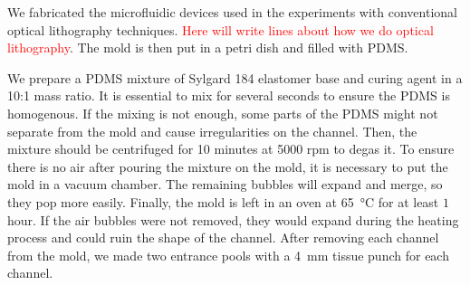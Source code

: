 We fabricated the microfluidic devices used in the experiments with conventional optical lithography techniques. \textcolor{red}{Here will write lines about how we do optical lithography}. The mold is then put in a petri dish and filled with PDMS. 


We prepare a PDMS mixture of Sylgard 184 elastomer base and curing agent in a 10:1 mass ratio. It is essential to mix for several seconds to ensure the PDMS is homogenous. If the mixing is not enough, some parts of the PDMS might not separate from the mold and cause irregularities on the channel. Then, the mixture should be centrifuged for 10 minutes at 5000 rpm to degas it. To ensure there is no air after pouring the mixture on the mold, it is necessary to put the mold in a vacuum chamber. The remaining bubbles will expand and merge, so they pop more easily. Finally, the mold is left in an oven at \SI{65}{\degreeCelsius} for at least $1$ hour. If the air bubbles were not removed, they would expand during the heating process and could ruin the shape of the channel. After removing each channel from the mold, we made two entrance pools with a \SI{4}{\milli\meter} tissue punch for each channel.

